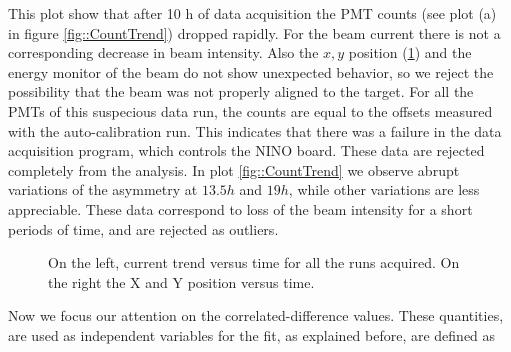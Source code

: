 This plot show that after 10 h of data acquisition the PMT counts (see plot (a) in figure \ref{fig::CountTrend}) dropped rapidly. For the beam current there is not a corresponding decrease in beam intensity. Also the $x,y$ position (\ref{fig::PositionTrend}) and the energy monitor of the beam do not show unexpected behavior, so we reject the possibility that the beam was not properly aligned to the target.
For all the PMTs of this suspecious data run, the counts are equal to the offsets measured with the auto-calibration run. 
This indicates that there was a failure in the data acquisition program, which controls the NINO board. These data are rejected completely from the analysis.
In plot \ref{fig::CountTrend} we observe abrupt variations of the asymmetry at $13.5 h$ and $19 h$, while other variations are less appreciable. These data correspond to loss of the beam intensity for a short periods of time, and are rejected as outliers. 

\begin{figure}[hbtp]
\centering
{}
\caption{On the left, current trend versus time for all the runs acquired. On the right the X and Y position versus time.}\label{fig::PositionTrend}
\end{figure}

Now we focus our attention on the correlated-difference values. These quantities, are used as independent variables for the fit, as explained before, are defined as 

